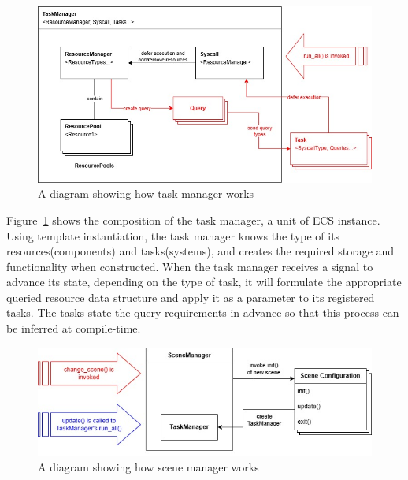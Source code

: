 \begin{figure}[h]
    \centering
    \includegraphics[width=\columnwidth, keepaspectratio]{images/taskmanager}
    \caption{A diagram showing how task manager works}
    \label{fig:taskmanager}
\end{figure}

\vspace{0.5cm}

\noindent Figure~\ref{fig:taskmanager} shows the composition of the task manager, a unit of ECS instance.
Using template instantiation, the task manager knows the type of its resources(components) and tasks(systems),
and creates the required storage and functionality when constructed.
When the task manager receives a signal to advance its state, depending on the type of task, it will
formulate the appropriate queried resource data structure and apply it as a parameter to its registered tasks.
The tasks state the query requirements in advance so that this process can be inferred at compile-time.

\vspace{0.5cm}

\begin{figure}[h]
    \centering
    \includegraphics[width=\columnwidth, keepaspectratio]{images/scenemanager}
    \caption{A diagram showing how scene manager works}
    \label{fig:scenemanager}
\end{figure}

